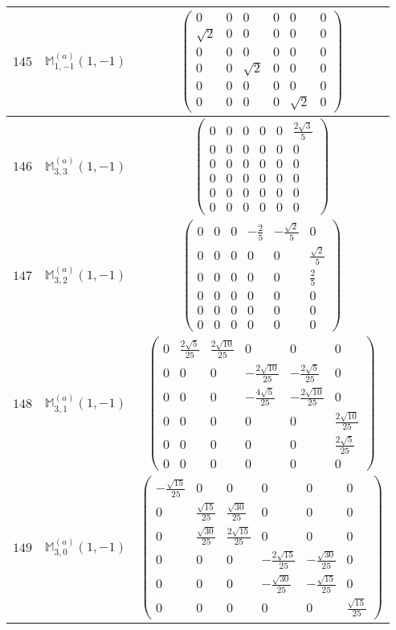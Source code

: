 \documentclass[fleqn,8pt,landscape]{jsarticle}
\begin{document}
\begin{center}
\begin{longtable}{ccc}
$ 145 $ & $ \mathbb{M}_{1,-1}^{(a)}(1,-1) $ & $ \begin{pmatrix} 0 & 0 & 0 & 0 & 0 & 0 \\ \sqrt{2} & 0 & 0 & 0 & 0 & 0 \\ 0 & 0 & 0 & 0 & 0 & 0 \\ 0 & 0 & \sqrt{2} & 0 & 0 & 0 \\ 0 & 0 & 0 & 0 & 0 & 0 \\ 0 & 0 & 0 & 0 & \sqrt{2} & 0 \end{pmatrix} $ \\ \hline
$ 146 $ & $ \mathbb{M}_{3,3}^{(a)}(1,-1) $ & $ \begin{pmatrix} 0 & 0 & 0 & 0 & 0 & \frac{2 \sqrt{3}}{5} \\ 0 & 0 & 0 & 0 & 0 & 0 \\ 0 & 0 & 0 & 0 & 0 & 0 \\ 0 & 0 & 0 & 0 & 0 & 0 \\ 0 & 0 & 0 & 0 & 0 & 0 \\ 0 & 0 & 0 & 0 & 0 & 0 \end{pmatrix} $ \\ \hline
$ 147 $ & $ \mathbb{M}_{3,2}^{(a)}(1,-1) $ & $ \begin{pmatrix} 0 & 0 & 0 & - \frac{2}{5} & - \frac{\sqrt{2}}{5} & 0 \\ 0 & 0 & 0 & 0 & 0 & \frac{\sqrt{2}}{5} \\ 0 & 0 & 0 & 0 & 0 & \frac{2}{5} \\ 0 & 0 & 0 & 0 & 0 & 0 \\ 0 & 0 & 0 & 0 & 0 & 0 \\ 0 & 0 & 0 & 0 & 0 & 0 \end{pmatrix} $ \\ \hline
$ 148 $ & $ \mathbb{M}_{3,1}^{(a)}(1,-1) $ & $ \begin{pmatrix} 0 & \frac{2 \sqrt{5}}{25} & \frac{2 \sqrt{10}}{25} & 0 & 0 & 0 \\ 0 & 0 & 0 & - \frac{2 \sqrt{10}}{25} & - \frac{2 \sqrt{5}}{25} & 0 \\ 0 & 0 & 0 & - \frac{4 \sqrt{5}}{25} & - \frac{2 \sqrt{10}}{25} & 0 \\ 0 & 0 & 0 & 0 & 0 & \frac{2 \sqrt{10}}{25} \\ 0 & 0 & 0 & 0 & 0 & \frac{2 \sqrt{5}}{25} \\ 0 & 0 & 0 & 0 & 0 & 0 \end{pmatrix} $ \\ \hline
$ 149 $ & $ \mathbb{M}_{3,0}^{(a)}(1,-1) $ & $ \begin{pmatrix} - \frac{\sqrt{15}}{25} & 0 & 0 & 0 & 0 & 0 \\ 0 & \frac{\sqrt{15}}{25} & \frac{\sqrt{30}}{25} & 0 & 0 & 0 \\ 0 & \frac{\sqrt{30}}{25} & \frac{2 \sqrt{15}}{25} & 0 & 0 & 0 \\ 0 & 0 & 0 & - \frac{2 \sqrt{15}}{25} & - \frac{\sqrt{30}}{25} & 0 \\ 0 & 0 & 0 & - \frac{\sqrt{30}}{25} & - \frac{\sqrt{15}}{25} & 0 \\ 0 & 0 & 0 & 0 & 0 & \frac{\sqrt{15}}{25} \end{pmatrix} $ \\ \hline

\end{longtable}
\end{center}
\end{document}
